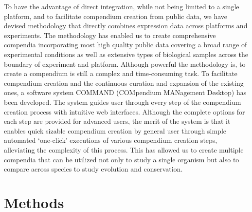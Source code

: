 To have the advantage of direct integration, while not being limited to a
single platform, and to facilitate compendium creation from public data, we
have devised methodology that directly combines expression data across
platforms and experiments.
%
The methodology has enabled us to create comprehensive compendia incorporating
most high quality public data covering a broad range of experimental conditions
as well as extensive types of biological samples across the boundary of
experiment and platform.
%
Although powerful the methodology is, to create a compendium is still a complex
and time-consuming task.
%
To facilitate compendium creation and the continuous curation and expansion of
the existing ones, a software system COMMAND (COMpendium MANagement Desktop)
has been developed.
%
The system guides user through every step of the compendium creation process
with intuitive web interfaces.
%
Although the complete options for each step are provided for advanced users,
the merit of the system is that it enables quick sizable compendium creation by
general user through simple automated `one-click' executions of various
compendium creation steps, alleviating the complexity of this process.
%
This has allowed us to create multiple compendia that can be utilized not only
to study a single organism but also to compare across species to study
evolution and conservation.
%
%



\section{Methods}



